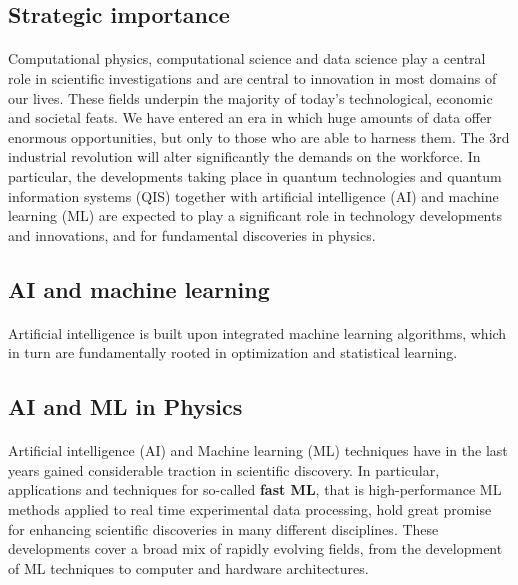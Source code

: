 \documentclass[%
oneside,                 %
final,                   %
10pt]{article}
\begin{document}
\noindent



\subsection*{Strategic importance}


\paragraph{}
Computational physics, computational science and data science play a
central role in scientific investigations and are central to
innovation in most domains of our lives. These fields underpin the
majority of today's technological, economic and societal feats. We
have entered an era in which huge amounts of data offer enormous
opportunities, but only to those who are able to harness them. The 3rd
industrial revolution will alter significantly the demands on the
workforce. In particular, the developments taking place in quantum
technologies and quantum information systems (QIS) together with
artificial intelligence (AI) and machine learning (ML) are expected to
play a significant role in technology developments and innovations,
and for fundamental discoveries in physics.



\subsection*{AI and machine learning}


\paragraph{}
Artificial
intelligence is built upon integrated machine learning algorithms,
which in turn are fundamentally rooted in optimization and statistical
learning.



\subsection*{AI and ML in Physics}


\paragraph{}
Artificial intelligence (AI) and Machine learning (ML) techniques have
in the last years gained considerable traction in scientific
discovery. In particular, applications and techniques for so-called
\textbf{fast ML}, that is high-performance ML methods applied to real time
experimental data processing, hold great promise for enhancing
scientific discoveries in many different disciplines.  These
developments cover a broad mix of rapidly evolving fields, from the
development of ML techniques to computer and hardware architectures.
\end{document}
